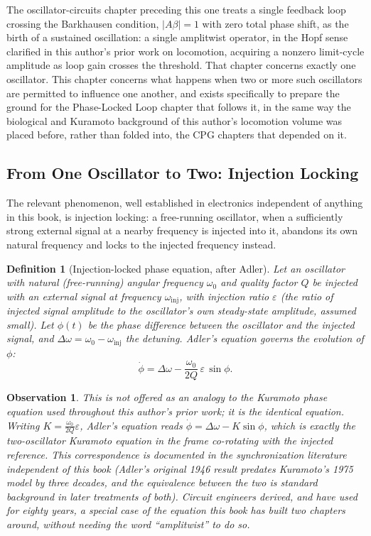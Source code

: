\documentclass[12pt]{article}
\newtheorem{definition}{Definition}
\newtheorem{observation}{Observation}
\begin{document}
The oscillator-circuits chapter preceding this one treats a single feedback loop crossing the Barkhausen condition, $|A\beta| = 1$ with zero total phase shift, as the birth of a sustained oscillation: a single amplitwist operator, in the Hopf sense clarified in this author's prior work on locomotion, acquiring a nonzero limit-cycle amplitude as loop gain crosses the threshold. That chapter concerns exactly one oscillator. This chapter concerns what happens when two or more such oscillators are permitted to influence one another, and exists specifically to prepare the ground for the Phase-Locked Loop chapter that follows it, in the same way the biological and Kuramoto background of this author's locomotion volume was placed before, rather than folded into, the CPG chapters that depended on it.

\subsection*{From One Oscillator to Two: Injection Locking}

The relevant phenomenon, well established in electronics independent of anything in this book, is injection locking: a free-running oscillator, when a sufficiently strong external signal at a nearby frequency is injected into it, abandons its own natural frequency and locks to the injected frequency instead.

\begin{definition}[Injection-locked phase equation, after Adler]
Let an oscillator with natural (free-running) angular frequency $\omega_0$ and quality factor $Q$ be injected with an external signal at frequency $\omega_{\text{inj}}$, with injection ratio $\varepsilon$ (the ratio of injected signal amplitude to the oscillator's own steady-state amplitude, assumed small). Let $\phi(t)$ be the phase difference between the oscillator and the injected signal, and $\Delta\omega = \omega_0 - \omega_{\text{inj}}$ the detuning. Adler's equation governs the evolution of $\phi$:
\[
\dot\phi = \Delta\omega - \frac{\omega_0}{2Q}\,\varepsilon\,\sin\phi.
\]
\end{definition}

\begin{observation}
This is not offered as an analogy to the Kuramoto phase equation used throughout this author's prior work; it is the identical equation. Writing $K = \frac{\omega_0}{2Q}\varepsilon$, Adler's equation reads $\dot\phi = \Delta\omega - K\sin\phi$, which is exactly the two-oscillator Kuramoto equation in the frame co-rotating with the injected reference. This correspondence is documented in the synchronization literature independent of this book (Adler's original 1946 result predates Kuramoto's 1975 model by three decades, and the equivalence between the two is standard background in later treatments of both). Circuit engineers derived, and have used for eighty years, a special case of the equation this book has built two chapters around, without needing the word ``amplitwist'' to do so.
\end{observation}
\end{document}

